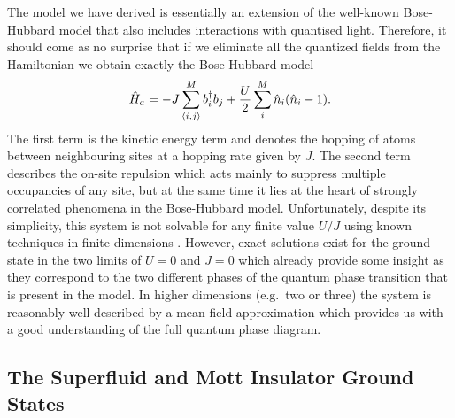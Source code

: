 The model we have derived is essentially an extension of the
well-known Bose-Hubbard model that also includes interactions with
quantised light. Therefore, it should come as no surprise that if we
eliminate all the quantized fields from the Hamiltonian we obtain
exactly the Bose-Hubbard model
\begin{equation}
  \hat{H}_a = -J \sum_{\langle i,j \rangle}^M b^\dagger_i b_j + 
  \frac{U}{2} \sum_{i}^M \hat{n}_i (\hat{n}_i - 1).
\end{equation}
The first term is the kinetic energy term and denotes the hopping of
atoms between neighbouring sites at a hopping rate given by $J$. The
second term describes the on-site repulsion which acts mainly to
suppress multiple occupancies of any site, but at the same time it
lies at the heart of strongly correlated phenomena in the Bose-Hubbard
model. Unfortunately, despite its simplicity, this system is not
solvable for any finite value $U/J$ using known techniques in finite
dimensions \cite{krauth1991, kolovsky2004, calzetta2006}. However,
exact solutions exist for the ground state in the two limits of
$U = 0$ and $J = 0$ which already provide some insight as they
correspond to the two different phases of the quantum phase transition
that is present in the model. In higher dimensions (e.g.~two or three)
the system is reasonably well described by a mean-field approximation
which provides us with a good understanding of the full quantum phase
diagram.

\subsection{The Superfluid and Mott Insulator Ground States}

